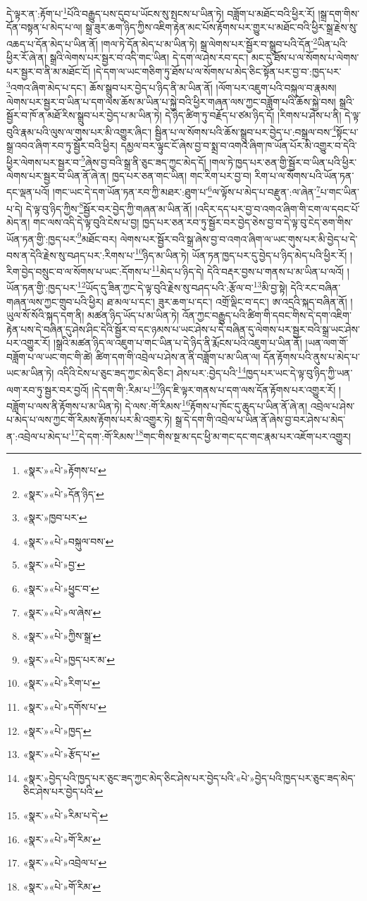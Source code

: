དེ་ལྟར་ན་:རྟོག་པ་\footnote{«སྣར་»«པེ་»རྟོགས་པ་}པོའི་བརྒྱུད་པས་དུབ་པ་ཡོངས་སུ་སྤངས་པ་ཡིན་ཏེ། བཟློག་པ་མཐོང་བའི་ཕྱིར་རོ། །སྒྲ་དག་གིས་དོན་བསྟན་པ་མེད་པ་ལ། སྒྲ་ཟུར་ཆག་ཉིད་ཀྱིས་འཇིག་རྟེན་མང་པོས་རྟོགས་པར་གྱུར་པ་མཐོང་བའི་ཕྱིར་སྒྲ་རྗེས་སུ་འཆད་པ་དོན་མེད་པ་ཡིན་ནོ། །གལ་ཏེ་དོན་མེད་པ་མ་ཡིན་ཏེ། སྒྲ་ལེགས་པར་སྦྱོར་བ་སྒྲུབ་པའི་དོན་\footnote{«སྣར་»«པེ་»དོན་ཉིད་}ཡིན་པའི་ཕྱིར་རོ་ཞེ་ན། སྒྲའི་ལེགས་པར་སྦྱར་བ་འདི་གང་ཡིན། དེ་དག་ལ་ཤེས་རབ་དང་། མང་དུ་ཐོས་པ་ལ་སོགས་པ་ལེགས་པར་སྦྱར་བ་ནི་མ་མཐོང་ངོ། །དེ་དག་ལ་ཡང་གཅིག་ཏུ་ཐོས་པ་ལ་སོགས་པ་མེད་ཅིང་སྟོན་པར་བྱ་བ་:ཁྱད་པར་\footnote{«སྣར་»ཁྱབ་པར་}འགའ་ཞིག་མེད་པ་དང་། ཆོས་སྒྲུབ་པར་བྱེད་པ་ཉིད་ནི་མ་ཡིན་ནོ། །ལོག་པར་འཇུག་པའི་བསྐུལ་བ་རྣམས། ལེགས་པར་སྦྱར་བ་ཡིན་པ་དག་ལས་ཆོས་མ་ཡིན་པ་སྐྱེ་བའི་ཕྱིར་གཞན་ལས་ཀྱང་བཟློག་པའི་ཆོས་སྐྱེ་བས། སྒྲའི་སྦྱོར་བ་ཁོ་ན་མཐོ་རིས་སྒྲུབ་པར་བྱེད་པ་མ་ཡིན་ཏེ། དེ་ཉིད་ཚིག་ཏུ་བརྗོད་པ་ཙམ་ཉིད་དོ། །རིགས་པ་ཤེས་པ་ནི། དེ་ལྟ་བུའི་རྣམ་པའི་ལུས་ལ་གུས་པར་མི་འགྱུར་ཞིང་། སྦྱིན་པ་ལ་སོགས་པའི་ཆོས་སྒྲུབ་པར་བྱེད་པ་:བསྒྲལ་བས་\footnote{«སྣར་»«པེ་»བསྐུལ་བས་}སྟོང་པ་སྒྲ་འབའ་ཞིག་རབ་ཏུ་སྦྱོར་བའི་ཕྱིར། དམྱལ་བར་ལྟུང་ངོ་ཞེས་བྱ་བ་སྨྲ་བ་འགའ་ཞིག་ཁ་ཡོན་པོར་མི་འགྱུར་བ་དེའི་ཕྱིར་ལེགས་པར་སྦྱར་བ་\footnote{«སྣར་»«པེ་»བྱ་}ཞེས་བྱ་བའི་སྒྲ་ནི་ཅུང་ཟད་ཀྱང་མེད་དོ། །གལ་ཏེ་ཁྱད་པར་ཅན་གྱི་སྦྱོར་བ་ཡིན་པའི་ཕྱིར་ལེགས་པར་སྦྱར་བ་ཡིན་ནོ་ཞེ་ན། ཁྱད་པར་ཅན་གང་ཡིན། གང་རིག་པར་བྱ་བ། རིག་པ་ལ་སོགས་པའི་ཡོན་ཏན་དང་ལྡན་པའོ། །གང་ཡང་དེ་དག་ཡོན་ཏན་རབ་ཀྱི་མཐར་:ཐུག་པ་\footnote{«སྣར་»«པེ་»ཕྱུང་བ་}ལ་ལྟོས་པ་མེད་པ་བརྫུན་:ལ་ཞེན་\footnote{«སྣར་»«པེ་»ལ་ཞེས་}པ་གང་ཡིན་པ་དེ། དེ་ལྟ་བུ་ཉིད་ཀྱིས་\footnote{«སྣར་»«པེ་»ཀྱིས་སྒྲ་}སྦྱོར་བར་བྱེད་ཀྱི་གཞན་མ་ཡིན་ནོ། །འདིར་དད་པར་བྱ་བ་འགའ་ཞིག་གི་ངག་ལ་དབང་པོ་མེད་ན། གང་ལས་འདི་དེ་ལྟ་བུའི་ངེས་པ་བྱ། ཁྱད་པར་ཅན་རབ་ཏུ་སྦྱོར་བར་བྱེད་ཅེས་བྱ་བ་དེ་ལྟ་བུ་ངེད་ཅག་གིས་ཡོན་ཏན་གྱི་:ཁྱད་པར་\footnote{«སྣར་»«པེ་»ཁྱད་པར་མ་}མཐོང་བར། ལེགས་པར་སྦྱོར་བའི་སྒྲ་ཞེས་བྱ་བ་འགའ་ཞིག་ལ་ཡང་གུས་པར་མི་བྱེད་པ་དེ་བས་ན་དེའི་རྗེས་སུ་བཤད་པར་:རིགས་པ་\footnote{«སྣར་»«པེ་»རིག་པ་}ཉིད་མ་ཡིན་ཏེ། ཡོན་ཏན་ཁྱད་པར་དུ་བྱེད་པ་ཉིད་མེད་པའི་ཕྱིར་རོ། །རིག་བྱེད་བསྲུང་བ་ལ་སོགས་པ་ཡང་:དོགས་པ་\footnote{«སྣར་»«པེ་»དགོས་པ་}མེད་པ་ཉིད་དེ། དེའི་བརྡར་བྱས་པ་གནས་པ་མ་ཡིན་པ་ལའོ། །ཡོན་ཏན་གྱི་:ཁྱད་པར་\footnote{«སྣར་»«པེ་»ཁྱད་}ཡོད་དུ་ཟིན་ཀྱང་དེ་ལྟ་བུའི་རྗེས་སུ་བཤད་པའི་:རྩོལ་བ་\footnote{«སྣར་»«པེ་»རྩོད་པ་}མི་བྱ་སྟེ། དེའི་རང་བཞིན་གཞན་ལས་ཀྱང་གྲུབ་པའི་ཕྱིར། ཐ་མལ་པ་དང་། ཟུར་ཆག་པ་དང་། འགྲོ་ལྡིང་བ་དང་། ཨ་འདྲའི་སྐད་བཞིན་ནོ། །ཡུལ་སོ་སོའི་སྐད་དག་ནི། མཚན་ཉིད་ཡོད་པ་མ་ཡིན་ཏེ། འོན་ཀྱང་བརྒྱུད་པའི་ཚིག་གི་དབང་གིས་དེ་དག་འཇིག་རྟེན་པས་དེ་བཞིན་དུ་ཤེས་ཤིང་དེའི་སྦྱོར་བ་དང་ཉམས་པ་ཡང་ཤེས་པ་དེ་བཞིན་དུ་ལེགས་པར་སྦྱར་བའི་སྒྲ་ཡང་ཤེས་པར་འགྱུར་རོ། །སྒྲའི་མཚན་ཉིད་ལ་འཇུག་པ་གང་ཡིན་པ་དེ་ཉིད་ནི་རྨོངས་པའི་འཇུག་པ་ཡིན་ནོ། །ཡན་ལག་གོ་བཟློག་པ་ལ་ཡང་གང་གི་ཚེ། ཚིག་དག་གི་འབྲེལ་པ་ཤེས་ན་ནི་བཟློག་པ་མ་ཡིན་ལ། དོན་རྟོགས་པའི་ནུས་པ་མེད་པ་ཡང་མ་ཡིན་ཏེ། འདིའི་ངེས་པ་ཅུང་ཟད་ཀྱང་མེད་ཅིང་། ཤེས་པར་:བྱེད་པའི་\footnote{«སྣར་»བྱེད་པའི་ཁྱད་པར་ཅུང་ཟད་ཀྱང་མེད་ཅིང་ཤེས་པར་བྱེད་པའི་«པེ་»བྱེད་པའི་ཁྱད་པར་ཅུང་ཟད་མེད་ཅིང་ཤེས་པར་བྱེད་པའི་}ཁྱད་པར་ཡང་དེ་ལྟ་བུ་ཉིད་ཀྱི་ཡན་ལག་རབ་ཏུ་སྦྱར་བར་བྱའོ། །དེ་དག་གི་:རིམ་པ་\footnote{«སྣར་»«པེ་»རིམ་པ་དེ་}ཉིད་ཇི་ལྟར་གནས་པ་དག་ལས་དོན་རྟོགས་པར་འགྱུར་རོ། །བཟློག་པ་ལས་ནི་རྟོགས་པ་མ་ཡིན་ཏེ། དེ་ལས་:གོ་རིམས་\footnote{«སྣར་»«པེ་»གོ་རིམ་}རྟོགས་པ་ཁོང་དུ་ཆུད་པ་ཡིན་ནོ་ཞེ་ན། འབྲེལ་པ་ཤེས་པ་མེད་པ་ལས་ཀྱང་གོ་རིམས་རྟོགས་པར་མི་འགྱུར་ཏེ། སྒྲ་དེ་དག་གི་འབྲེལ་པ་ཡིན་ནོ་ཞེས་བྱ་བར་ཤེས་པ་མེད་ན་:འབྲེལ་པ་མེད་པ་\footnote{«སྣར་»«པེ་»འབྲེལ་པ་}དེ་དག་:གོ་རིམས་\footnote{«སྣར་»«པེ་»གོ་རིམ་}གང་གིས་སྔ་མ་དང་ཕྱི་མ་གང་དང་གང་རྣམ་པར་འཇོག་པར་འགྱུར། 